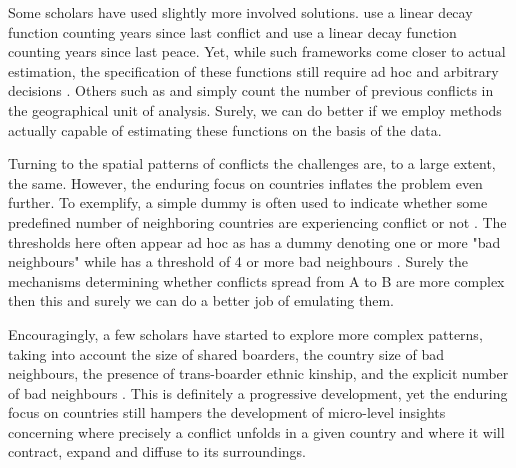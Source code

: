 \documentclass[a4paper]{article}
\begin{document}
Some scholars have used slightly more involved solutions. \cite{Collier_Hoeffler_2004} use a linear decay function counting years since last conflict and \cite{Hegre_Sambanis_2006} use a linear decay function counting years since last peace. Yet, while such frameworks come closer to actual estimation, the specification of these functions still require ad hoc and arbitrary decisions \cite[501]{Gelman_2013}. Others such as \cite{Cederman_Gleditsch_Buhaug_2013} and \cite{Maase} simply count the number of previous conflicts in the geographical unit of analysis. Surely, we can do better if we employ methods actually capable of estimating these functions on the basis of the data.\par

Turning to the spatial patterns of conflicts the challenges are, to a large extent, the same. However, the enduring focus on countries inflates the problem even further. To exemplify, a simple dummy is often used to indicate whether some predefined number of neighboring countries are experiencing conflict or not \citep{Hegre_Sambanis_2006, Goldstone_2010}. The thresholds here often appear ad hoc as \cite{Hegre_Sambanis_2006} has a dummy denoting one or more "bad neighbours" \citep[521-522]{Hegre_Sambanis_2006} while \cite{Goldstone_2010} has a threshold of 4 or more bad neighbours \citep[197]{Goldstone_2010}. Surely the mechanisms determining whether conflicts spread from A to B are more complex then this and surely we can do a better job of emulating them.\par 

Encouragingly, a few scholars have started to explore more complex patterns, taking into account the size of shared boarders, the country size of bad neighbours, the presence of trans-boarder ethnic kinship, and the explicit number of bad neighbours \citep{buhaug2008contagion, Cederman_Gleditsch_Buhaug_2013, bara_2017}. This is definitely a progressive development, yet the enduring focus on countries still hampers the development of micro-level insights concerning where precisely a conflict unfolds in a given country and where it will contract, expand and diffuse to its surroundings.\par


\end{document}
